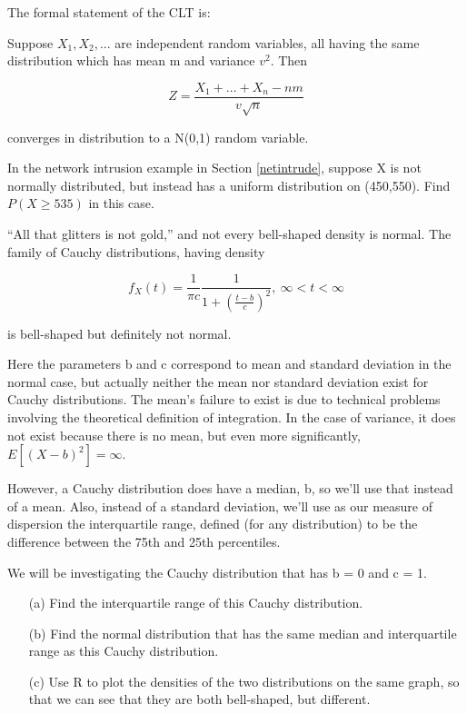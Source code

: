 The formal statement of the CLT is:

\begin{theorem}
Suppose $X_1, X_2, ...$ are independent random variables, all having the
same distribution which has mean m and variance $v^2$.  Then

\begin{equation}
\label{cltquant}
Z = 
\frac
{X_1+...+X_n -n m}
{v \sqrt{n}}
\end{equation}

converges in distribution to a N(0,1) random variable.  

\end{theorem}

\startproblemset

\oneproblem
In the network intrusion example in Section \ref{netintrude}, suppose 
X is not normally distributed, but instead has a uniform distribution on
(450,550).  Find $P(X \geq 535)$ in this case.

\oneproblem
``All that glitters is not gold,'' and not every bell-shaped density is
normal. The family of Cauchy distributions, having density

\begin{equation}
f_X(t) = \frac{1}{\pi c}
\frac{1}{1 + (\frac{t-b}{c})^2}, ~ \infty < t < \infty
\end{equation}

is bell-shaped but definitely not normal.  

Here the parameters b and c correspond to mean and standard deviation in
the normal case, but actually neither the mean nor standard deviation
exist for Cauchy distributions. The mean's failure to exist is due to
technical problems involving the theoretical definition of integration.
In the case of variance, it does not exist because there is no mean, but
even more significantly, $E[(X-b)^2] = \infty$.  

However, a Cauchy distribution does have a median, b, so we'll use that
instead of a mean. Also, instead of a standard deviation, we'll use as
our measure of dispersion the interquartile range, defined (for any
distribution) to be the difference between the 75th and 25th
percentiles.

We will be investigating the Cauchy distribution that has b = 0 and c = 1.

\begin{itemize}

\item [(a)] Find the interquartile range of this Cauchy distribution. 

\item [(b)] Find the normal distribution that has the same median and interquartile range as this Cauchy distribution. 

\item [(c)] Use R to plot the densities of the two distributions on the same
graph, so that we can see that they are both bell-shaped, but different. 

\end{itemize}

